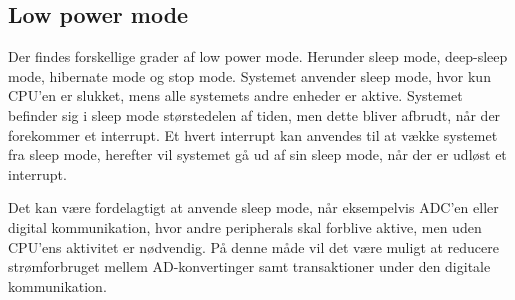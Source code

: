 \subsection{Low power mode}

Der findes forskellige grader af low power mode. Herunder sleep mode, deep-sleep mode, hibernate mode og stop mode. Systemet anvender sleep mode, hvor kun CPU'en er slukket, mens alle systemets andre enheder er aktive. Systemet befinder sig i sleep mode størstedelen af tiden, men dette bliver afbrudt, når der forekommer et interrupt. Et hvert interrupt kan anvendes til at vække systemet fra sleep mode, herefter vil systemet gå ud af sin sleep mode, når der er udløst et interrupt. 

Det kan være fordelagtigt at anvende sleep mode, når eksempelvis ADC'en eller digital kommunikation, hvor andre peripherals skal forblive aktive, men uden CPU'ens aktivitet er nødvendig. På denne måde vil det være muligt at reducere strømforbruget mellem AD-konvertinger samt transaktioner under den digitale kommunikation.\citep{cypresspsoc420152}
